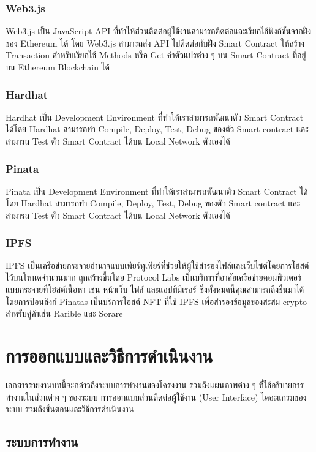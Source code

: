 \documentclass[12pt,oneside,openright,a4paper]{cpe-thai-project}
\begin{document}
\subsection{Web3.js \cite{web3js}}
\tab Web3.js เป็น JavaScript API ที่ทําให้ส่วนติดต่อผู้ใช้งานสามารถติดต่อและเรียกใช้ฟังก์ชันจากฝั่งของ Ethereum ได้ โดย Web3.js สามารถส่ง API ไปติดต่อกับฝั่ง Smart Contract ให้สร้าง Transaction สําหรับเรียกใช้ Methods หรือ Get ค่าตัวแปรต่าง ๆ บน Smart Contract ที่อยู่บน Ethereum Blockchain ได้
\clearpage

\subsection{Hardhat \cite{hardhat}}
\tab Hardhat เป็น Development Environment ที่ทำให้เราสามารถพัฒนาตัว Smart Contract ได้โดย Hardhat สามารถทำ Compile, Deploy, Test, Debug ของตัว Smart contract และ สามารถ Test ตัว Smart Contract ได้บน Local Network ตัวเองได้

\subsection{Pinata \cite{pinata}}
\tab Pinata เป็น Development Environment ที่ทำให้เราสามารถพัฒนาตัว Smart Contract ได้โดย Hardhat สามารถทำ Compile, Deploy, Test, Debug ของตัว Smart contract และ สามารถ Test ตัว Smart Contract ได้บน Local Network ตัวเองได้

\subsection{IPFS \cite{ipfs}}
\tab IPFS เป็นเครือข่ายกระจายอำนาจแบบเพียร์ทูเพียร์ที่ช่วยให้ผู้ใช้สำรองไฟล์และเว็บไซต์โดยการโฮสต์ไว้บนโหนดจำนวนมาก ถูกสร้างขึ้นโดย Protocol Labs เป็นบริการที่อาศัยเครือข่ายคอมพิวเตอร์แบบกระจายที่โฮสต์เนื้อหา เช่น หน้าเว็บ ไฟล์ และแอปที่มิเรอร์ ซึ่งทั้งหมดนี้คุณสามารถดึงขึ้นมาได้โดยการป้อนลิงก์
Pinatas เป็นบริการโฮสต์ NFT ที่ใช้ IPFS เพื่อสำรองข้อมูลของสะสม crypto สำหรับคู่ค้าเช่น Rarible และ Sorare


\chapter{การออกแบบและวิธีการดำเนินงาน}
\tab เอกสารรายงานบทนี้จะกล่าวถึงระบบการทำงานของโครงงาน รวมถึงแผนภาพต่าง ๆ ที่ใช้อธิบายการทำงานในส่วนต่าง ๆ ของระบบ การออกแบบส่วนติดต่อผู้ใช้งาน (User Interface) ไดอะแกรมของระบบ รวมถึงขั้นตอนและวิธีการดำเนินงาน
\section{ระบบการทำงาน}
\end{document}
